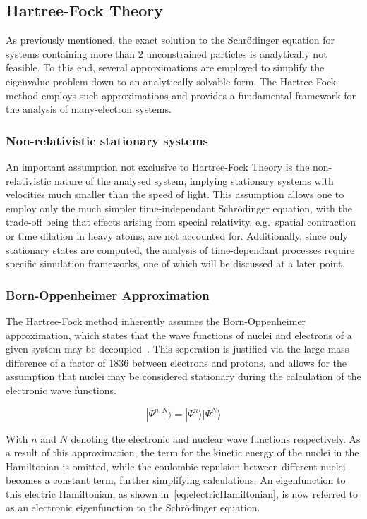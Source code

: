 \documentclass[12pt]{article}
\begin{document}
\bigskip

\subsection{Hartree-Fock Theory}
As previously mentioned, the exact solution to the Schrödinger equation for systems containing more than 2 unconstrained particles is analytically not feasible.
To this end, several approximations are employed to simplify the eigenvalue problem down to an analytically solvable form.
The Hartree-Fock method employs such approximations and provides a fundamental framework for the analysis of many-electron systems.

\subsubsection{Non-relativistic stationary systems}
An important assumption not exclusive to Hartree-Fock Theory is the non-relativistic nature of the analysed system, 
implying stationary systems with velocities much smaller than the speed of light.
This assumption allows one to employ only the much simpler time-independant Schrödinger equation, with the trade-off being that effects arising from special relativity, e.g.~spatial contraction or time dilation in heavy atoms, are not accounted for.
Additionally, since only stationary states are computed, the analysis of time-dependant processes require specific simulation frameworks, one of which will be discussed at a later point.

\subsubsection{Born-Oppenheimer Approximation}
The Hartree-Fock method inherently assumes the Born-Oppenheimer approximation, which states that the wave functions of nuclei and electrons of a given system may be decoupled~\cite{Born1927}.
This seperation is justified via the large mass difference of a factor of 1836 between electrons and protons, and allows for the assumption that nuclei may be considered stationary during the calculation of the electronic wave functions.

\begin{equation}
  |\Psi^{n, N}\rangle = |\Psi^{n}\rangle|\Psi^{N}\rangle 
\end{equation}

\bigskip

\noindent With $n$ and $N$ denoting the electronic and nuclear wave functions respectively. As a result of this approximation,
the term for the kinetic energy of the nuclei in the Hamiltonian is omitted, while the coulombic repulsion between different nuclei becomes a constant term, further simplifying calculations.
An eigenfunction to this electric Hamiltonian, as shown in~\ref{eq:electricHamiltonian},  is now referred to as an electronic eigenfunction to the Schrödinger equation.
\end{document}
